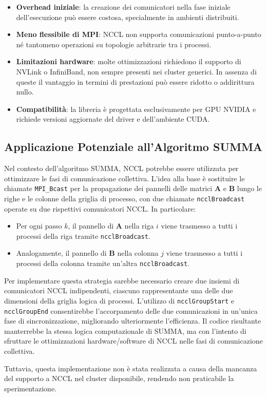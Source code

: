 \documentclass[a4paper]{article}
\begin{document}
\begin{itemize}
    \item \textbf{Overhead iniziale}: la creazione dei comunicatori nella fase iniziale dell'esecuzione può essere costosa, specialmente in ambienti distribuiti.
    \item \textbf{Meno flessibile di MPI}: NCCL non supporta comunicazioni punto-a-punto né tantomeno operazioni su topologie arbitrarie tra i processi.
    \item \textbf{Limitazioni hardware}: molte ottimizzazioni richiedono il supporto di NVLink o InfiniBand, non sempre presenti nei cluster generici. In assenza di queste il vantaggio in termini di prestazioni può essere ridotto o addirittura nullo.
    \item \textbf{Compatibilità}: la libreria è progettata esclusivamente per GPU NVIDIA e richiede versioni aggiornate del driver e dell’ambiente CUDA.
\end{itemize}

\subsection{Applicazione Potenziale all’Algoritmo SUMMA}

Nel contesto dell’algoritmo SUMMA, NCCL potrebbe essere utilizzata per ottimizzare le fasi di comunicazione collettiva.
L’idea alla base è sostituire le chiamate \texttt{MPI\_Bcast} per la propagazione dei pannelli delle matrici $\mathbf{A}$ e $\mathbf{B}$ lungo le righe e le colonne della griglia di processo, con due chiamate \texttt{ncclBroadcast} operate su due rispettivi comunicatori NCCL. In particolare:

\begin{itemize}
    \item Per ogni passo $k$, il pannello di $\mathbf{A}$ nella riga $i$ viene trasmesso a tutti i processi della riga tramite \texttt{ncclBroadcast}.
    \item Analogamente, il pannello di $\mathbf{B}$ nella colonna $j$ viene trasmesso a tutti i processi della colonna tramite un’altra \texttt{ncclBroadcast}.
\end{itemize}

Per implementare questa strategia sarebbe necessario creare due insiemi di comunicatori NCCL indipendenti, ciascuno rappresentante una delle due dimensioni della griglia logica di processi. L’utilizzo di \texttt{ncclGroupStart} e \texttt{ncclGroupEnd} consentirebbe l’accorpamento delle due comunicazioni in un’unica fase di sincronizzazione, migliorando ulteriormente l'efficienza.
Il codice risultante manterrebbe la stessa logica computazionale di SUMMA, ma con l'intento di sfruttare le ottimizzazioni hardware/software di NCCL nelle fasi di comunicazione collettiva.

Tuttavia, questa implementazione non è stata realizzata a causa della mancanza del supporto a NCCL nel cluster disponibile, rendendo non praticabile la sperimentazione.


\printbibliography
\end{document}
